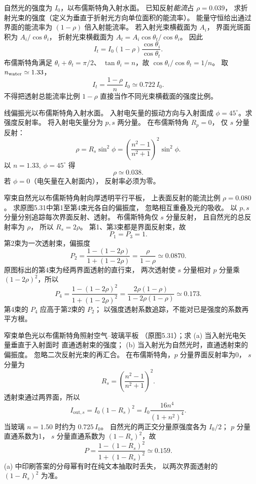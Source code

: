 自然光的强度为 $I_0$，以布儒斯特角入射水面。
已知反射\emph{能流}占 $\rho=0.039$，
求折射光束的强度（定义为垂直于折射光方向单位面积的能流率）。
\exsolution
能量守恒给出通过界面的能流率为
$(1-\rho)$ 倍入射能流率。
若入射光束横截面为 $A_i$，
界面光斑面积为 $A_i/\cos\theta_i$，
折射光束横截面为
$A_t=A_i\cos\theta_t/\cos\theta_i$。
因此
\[
 I_t=I_0(1-\rho)\frac{\cos\theta_i}{\cos\theta_t}.
\]
布儒斯特角满足
$\theta_i+\theta_t=\pi/2$、
$\tan\theta_i=n$，故
$\cos\theta_i/\cos\theta_t=1/n$。
取 $n_{\rm water}\simeq1.33$，
\[
 \boxed{I_t=\frac{1-\rho}{n}\,I_0
 \simeq0.722\,I_0}.
\]
\excheck 不得把透射总能流率比例 $1-\rho$
直接当作不同光束横截面的强度比例。

线偏振光以布儒斯特角入射水面。
入射电矢量的振动方向与入射面成
$\phi=45^\circ$。求强度反射率。
\exsolution
将入射电矢量分为 $p,s$ 两分量。
在布儒斯特角 $R_p=0$，
仅 $s$ 分量反射：
\[
 \rho=R_s\sin^2\phi
 =\left(\frac{n^2-1}{n^2+1}\right)^2\sin^2\phi.
\]
以 $n=1.33,\ \phi=45^\circ$ 得
\[
 \boxed{\rho\simeq0.038}.
\]
\excheck 若 $\phi=0$（电矢量在入射面内），
反射率必须为零。

窄束自然光以布儒斯特角射向厚透明平行平板，
上表面反射的能流比例 $\rho=0.080$。
求原图5.31中第1至第4束光各自的偏振度，
忽略相互重叠及光的吸收。
\exsolution
以 $p,s$ 分量分别追踪每次界面反射、透射。
布儒斯特角仅 $s$ 分量反射，
且自然光的总反射率为 $\rho$，
所以 $R_s=2\rho$。
第1、第3束都是界面反射束，故
\[
 \boxed{P_1=P_3=1}.
\]
第2束为一次透射束，偏振度
\[
 \boxed{P_2=\frac{1-(1-2\rho)}{1+(1-2\rho)}
 =\frac{\rho}{1-\rho}\simeq0.0870}.
\]
原图标出的第4束为经两界面透射的直行束，
两次透射使 $s$ 分量相对 $p$ 分量乘
$(1-2\rho)^2$，所以
\[
 \boxed{P_4=\frac{1-(1-2\rho)^2}{1+(1-2\rho)^2}
 =\frac{2\rho(1-\rho)}{1-2\rho(1-\rho)}
 \simeq0.173}.
\]
\excheck 第4束的 $P_4$ 应高于第2束的 $P_2$；
以强度透射系数追踪，不能对已是强度的系数再平方根。

窄束单色光以布儒斯特角照射空气--玻璃平板
（原图5.31）；求 (a) 当入射光电矢量垂直于入射面时
直通透射束的强度；
(b) 当入射光为自然光时，直通透射束的偏振度。
忽略二次反射光束的再汇合。
\exsolution
在布儒斯特角，$p$ 分量界面反射率为0，
$s$ 分量为
\[
 R_s=\left(\frac{n^2-1}{n^2+1}\right)^2.
\]
透射束通过两界面，所以
\[
 \boxed{I_{\mathrm{out},s}
 =I_0(1-R_s)^2
 =I_0\frac{16n^4}{(1+n^2)^4}}.
\]
当玻璃 $n=1.50$ 时约为 $0.725\,I_0$。
自然光的两正交分量原强度各为 $I_0/2$；
$p$ 分量直通系数为1，
$s$ 分量直通系数为 $(1-R_s)^2$，故
\[
 \boxed{P=\frac{1-(1-R_s)^2}
 {1+(1-R_s)^2}\simeq0.159}.
\]
\excheck (a) 中印刷答案的分母幂有时在纯文本抽取时丢失，
以两次界面透射的 $(1-R_s)^2$ 为准。

